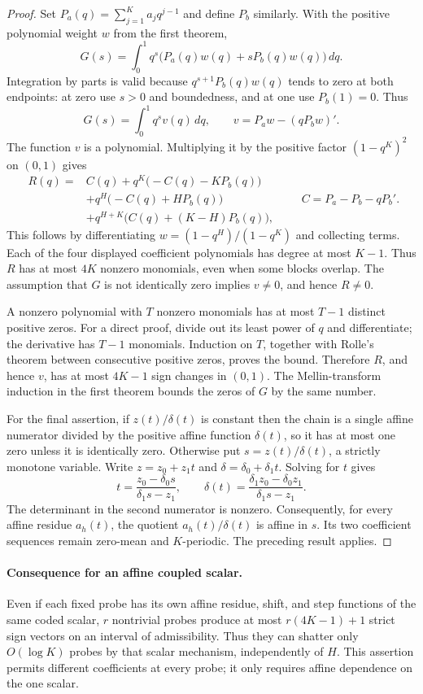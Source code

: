 \documentclass[11pt]{article}
\begin{document}
\begin{proof}
Set $P_a(q)=\sum_{j=1}^K a_jq^{j-1}$ and define $P_b$ similarly.
With the positive polynomial weight $w$ from the first theorem,
\[
 G(s)=\int_0^1q^s\bigl(P_a(q)w(q)+sP_b(q)w(q)\bigr)\,dq.
\]
Integration by parts is valid because
$q^{s+1}P_b(q)w(q)$ tends to zero at both endpoints: at zero use
$s>0$ and boundedness, and at one use $P_b(1)=0$. Thus
\[
 G(s)=\int_0^1 q^s v(q)\,dq,\qquad
 v=P_aw-(qP_bw)'.
\]
The function $v$ is a polynomial. Multiplying it by the positive
factor $(1-q^K)^2$ on $(0,1)$ gives
\[
 \begin{split}
 R(q)={}&C(q)+q^K\bigl(-C(q)-KP_b(q)\bigr)\\
       &+q^H\bigl(-C(q)+HP_b(q)\bigr)\\
       &+q^{H+K}\bigl(C(q)+(K-H)P_b(q)\bigr),
 \end{split}
 \qquad C=P_a-P_b-qP_b'.
\]
This follows by differentiating
$w=(1-q^H)/(1-q^K)$ and collecting terms. Each of the four displayed
coefficient polynomials has degree at most $K-1$. Thus $R$ has
at most $4K$ nonzero monomials, even when some blocks overlap.
The assumption that $G$ is not identically zero implies $v\ne0$,
and hence $R\ne0$.

A nonzero polynomial with $T$ nonzero monomials has at most $T-1$
distinct positive zeros. For a direct proof, divide out its least
power of $q$ and differentiate; the derivative has $T-1$ monomials.
Induction on $T$, together with Rolle's theorem between consecutive
positive zeros, proves the bound. Therefore $R$, and hence $v$, has
at most $4K-1$ sign changes in $(0,1)$. The Mellin-transform induction
in the first theorem bounds the zeros of $G$ by the same number.

For the final assertion, if $z(t)/\delta(t)$ is constant then the
chain is a single affine numerator divided by the positive affine
function $\delta(t)$, so it has at most one zero unless it is
identically zero. Otherwise put $s=z(t)/\delta(t)$, a strictly
monotone variable. Write $z=z_0+z_1t$ and
$\delta=\delta_0+\delta_1t$. Solving for $t$ gives
\[
 t=\frac{z_0-\delta_0s}{\delta_1s-z_1},\qquad
 \delta(t)=\frac{\delta_1z_0-\delta_0z_1}{\delta_1s-z_1}.
\]
The determinant in the second numerator is nonzero. Consequently,
for every affine residue $a_h(t)$, the quotient
$a_h(t)/\delta(t)$ is affine in $s$. Its two coefficient sequences
remain zero-mean and $K$-periodic. The preceding result applies.
\end{proof}

\paragraph{Consequence for an affine coupled scalar.}
Even if each fixed probe has its own affine residue, shift, and step
functions of the same coded scalar, $r$ nontrivial probes produce at
most $r(4K-1)+1$ strict sign vectors on an interval of admissibility.
Thus they can shatter only $O(\log K)$ probes by that scalar mechanism,
independently of $H$. This assertion permits different coefficients
at every probe; it only requires affine dependence on the one scalar.
\end{document}
